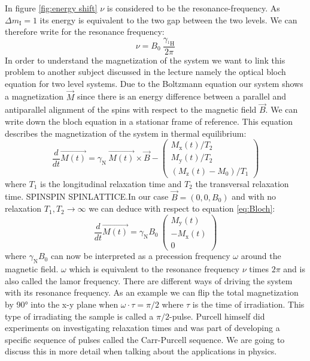\documentclass{article}
\begin{document}
In figure \ref{fig:energy shift} $\nu$ is considered to be the resonance-frequency. As $\Delta m_{\mathrm{I}}=1$ its energy is equivalent to the two gap between the two levels. We can therefore write for the resonance frequency:
\begin{equation}
    \nu=B_0 \ \dfrac{\gamma_{\mathrm{^1\mathrm{H}}} }{2\pi}
    \label{eq:resonance frequency}
\end{equation}
In order to understand the magnetization of the system we want to link this problem to another subject discussed in the lecture namely the optical bloch equation for two level systems. Due to the Boltzmann equation our system shows a magnetization $\Vec{M}$ since there is an energy difference between a parallel and antiparallel alignment of the spins with respect to the magnetic field $\Vec{B}$. We can write down the bloch equation in a stationar frame of reference. This equation describes the magnetization of the system in thermal equilibrium:
\begin{equation}
    \dfrac{d}{dt}\Vec{M(t)}=\gamma_{\mathrm{N}}\  \Vec{M(t)} \times \Vec{B} -\begin{pmatrix} M_{\mathrm{x}}(t)/T_2 \\ M_{\mathrm{y}}(t)/T_2 \\ (M_{\mathrm{z}}(t)-M_0)/T_1 \end{pmatrix}
    \label{eq:Bloch}
\end{equation}
where $T_1$ is the longitudinal relaxation time and $T_2$ the transversal relaxation time. SPINSPIN SPINLATTICE.In our case $\Vec{B}=(0,0,B_\mathrm{0})$ and with no relaxation $T_1, T_2\rightarrow \infty$ we can deduce with respect to equation \ref{eq:Bloch}:
\begin{equation}
    \dfrac{d}{dt}\Vec{M(t)}= \gamma_{\mathrm{N}} B_{\mathrm{0}} \ \begin{pmatrix} M_{\mathrm{y}}(t) \\ -M_{\mathrm{x}}(t) \\ 0 \end{pmatrix}
    \label{eq:precession}
\end{equation}
where $\gamma_{\mathrm{N}} B_{\mathrm{0}}$ can now be interpreted as a precession frequency $\omega$ around the magnetic field. $\omega$ which is equivalent to the resonance frequency  $\nu$ times $2\pi$ and is also called the lamor frequency. There are different ways of driving the system with its resonance frequency. As an example we can flip the total magnetization by 90° into the x-y plane when $\omega\cdot \tau=\pi/2$ where $\tau$ is the time of irradiation. This type of irradiating the sample is called a $\pi/2$-pulse. Purcell himself did experiments on investigating relaxation times and was part of developing a specific sequence of pulses called the Carr-Purcell sequence. We are going to discuss this in more detail when talking about the applications in physics.
\end{document}
